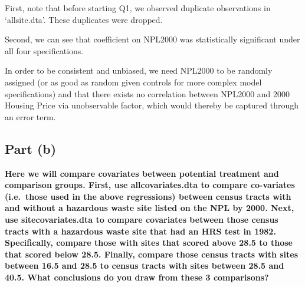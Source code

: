 \documentclass[
]{article}
\begin{document}
First, note that before starting Q1, we observed duplicate observations
in `allsite.dta'. These duplicates were dropped.

Second, we can see that coefficient on NPL2000 was statistically
significant under all four specifications.

In order to be consistent and unbiased, we need NPL2000 to be randomly
assigned (or as good as random given controls for more complex model
specifications) and that there exists no correlation between NPL2000 and
2000 Housing Price via unobservable factor, which would thereby be
captured through an error term.

\newpage

\hypertarget{part-b}{%
\subsection{Part (b)}\label{part-b}}

\textbf{Here we will compare covariates between potential treatment and
comparison groups. First, use allcovariates.dta to compare co-variates
(i.e.~those used in the above regressions) between census tracts with
and without a hazardous waste site listed on the NPL by 2000. Next, use
sitecovariates.dta to compare covariates between those census tracts
with a hazardous waste site that had an HRS test in 1982. Specifically,
compare those with sites that scored above 28.5 to those that scored
below 28.5. Finally, compare those census tracts with sites between 16.5
and 28.5 to census tracts with sites between 28.5 and 40.5. What
conclusions do you draw from these 3 comparisons?}
\end{document}

